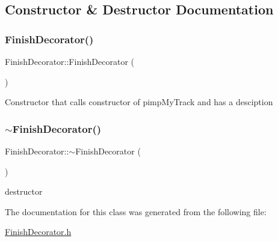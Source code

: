 \subsection{Constructor \& Destructor Documentation}
\mbox{\label{class_finish_decorator_a4f91e93aa36b9094d46361617cc64cc7}} 
\subsubsection{\texorpdfstring{Finish\+Decorator()}{FinishDecorator()}}
{\footnotesize\ttfamily Finish\+Decorator\+::\+Finish\+Decorator (\begin{DoxyParamCaption}{ }\end{DoxyParamCaption})\hspace{0.3cm}{\ttfamily [inline]}}

Constructor that calls constructor of pimp\+My\+Track and has a desciption \mbox{\label{class_finish_decorator_adfb208ad602dff987414885cfbaec66b}} 
\subsubsection{\texorpdfstring{$\sim$\+Finish\+Decorator()}{~FinishDecorator()}}
{\footnotesize\ttfamily Finish\+Decorator\+::$\sim$\+Finish\+Decorator (\begin{DoxyParamCaption}{ }\end{DoxyParamCaption})\hspace{0.3cm}{\ttfamily [inline]}}

destructor 

The documentation for this class was generated from the following file\+:\begin{DoxyCompactItemize}
\item 
\mbox{\hyperlink{_finish_decorator_8h}{Finish\+Decorator.\+h}}\end{DoxyCompactItemize}

